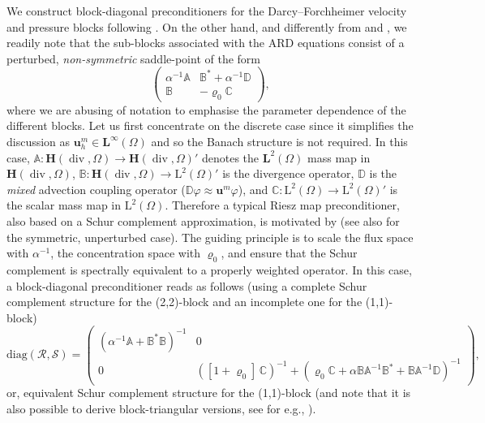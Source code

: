 \documentclass[11pt, reqno, a4paper, twoside]{article}
\newcommand{\bu}{\boldsymbol{u}}
\newcommand{\rL}{\mathrm{L}}
\newcommand{\bH}{\mathbf{H}}
\newcommand{\bL}{\mathbf{L}}
\newcommand{\bbA}{\mathbb{A}}
\newcommand{\bbD}{\mathbb{D}}
\newcommand{\bbB}{\mathbb{B}}
\newcommand{\bbC}{\mathbb{C}}
\newcommand{\cS}{\mathcal{S}}
\newcommand{\cR}{\mathcal{R}}
\newcommand\vdiv{\mathop{\mathrm{div}}\nolimits}
\numberwithin{equation}{section}
\numberwithin{remark}{section}
\numberwithin{figure}{section}
\numberwithin{table}{section}
\begin{document}
{We construct block-diagonal preconditioners for the Darcy--Forchheimer velocity and pressure blocks following 
\cite{dhpr_sinum26}. On the other hand, and differently from \cite{cai2026parameter} and \cite{dhpr_sinum26}, we readily note that the sub-blocks associated with the ARD equations consist of a perturbed, \emph{non-symmetric} saddle-point of the form 
\begin{equation}\label{abstract-block} \begin{pmatrix} \alpha^{-1}\bbA & \bbB^* + \alpha^{-1}\bbD \\ \bbB & - \varrho_0 \bbC\end{pmatrix},\end{equation}
where we are abusing of notation to emphasise the parameter dependence of the different blocks. 
Let us first concentrate on the discrete case since it simplifies the discussion as $\bu_h^m \in \bL^{\infty}(\Omega)$ and so the Banach structure is not required. In this case, $\bbA:\bH(\vdiv,\Omega)\to \bH(\vdiv,\Omega)'$ denotes the  $\bL^2(\Omega)$ mass map in $\bH(\vdiv,\Omega)$, $\bbB:\bH(\vdiv,\Omega)\to \rL^2(\Omega)'$ is the divergence operator, $\bbD$ is the \textit{mixed} advection coupling operator ($\bbD\varphi \approx \bu^m\varphi$), and $
\bbC:\rL^2(\Omega) \to \rL^2(\Omega)'$ is the scalar mass map in $\rL^2(\Omega)$. 
Therefore a typical Riesz map preconditioner, also based on a Schur complement approximation, is motivated by \cite[Sect. 3.1]{benzi2005numerical} (see also \cite[Section 1]{baerland2020observation} for the symmetric, unperturbed case). The guiding principle is to scale the flux space with $\alpha^{-1}$, the concentration space with $\varrho_0$, and ensure that the Schur complement is spectrally equivalent to a properly weighted  operator.
In this case, a block-diagonal preconditioner  
reads as follows (using {a complete Schur complement structure for the (2,2)-block and an incomplete one for the (1,1)-block}) 
\begin{equation}\label{abstract-prec} 
 \mathrm{diag}(\cR,\cS) = \begin{pmatrix}(\alpha^{-1}\bbA +  \bbB^*\bbB)^{-1} & 0 \\ 0 & ([1+\varrho_0]\,\bbC)^{-1}+(\varrho_0 \bbC + \alpha \bbB\bbA^{-1}\bbB^* + \bbB\bbA^{-1}\bbD)^{-1}
\end{pmatrix},
\end{equation}
or, equivalent Schur complement structure for the (1,1)-block
(and note that it is also possible to derive block-triangular versions, see for e.g., \cite{olshanskii2007pressure}). 
}
\end{document}
